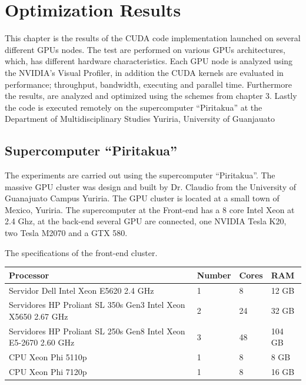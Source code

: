 
\chapter{Optimization Results} %

\label{Optimization Results} %



This chapter is the results of the CUDA code implementation launched on several different GPUs nodes. The test are performed on various GPUs architectures, which, has different hardware characteristics. Each GPU node is analyzed using the NVIDIA's Visual Profiler, in addition the CUDA kernels are evaluated in performance; throughput, bandwidth, executing and parallel time. Furthermore the results, are analyzed and optimized using the schemes from chapter 3. Lastly the code is executed remotely on the supercomputer ``Piritakua'' at the Department of Multidisciplinary Studies Yuriria, University of Guanjauato

\section{Supercomputer ``Piritakua''}

The experiments are carried out using the supercomputer “Piritakua”. The massive GPU cluster was design and built by Dr. Claudio from the University of Guanajuato Campus Yuriria. The GPU cluster is located at a small town of Mexico, Yuriria. The supercomputer at the Front-end has a 8 core Intel Xeon at 2.4 Ghz, at the back-end several GPU are connected, one NVIDIA Tesla K20, two Tesla M2070 and a GTX 580.

The specifications of the front-end cluster.

\begin{tabular}{ | p{7.1cm}  | l | l | l |}
  \hline
  Processor & Number & Cores & RAM  \\
  \hline
  Servidor Dell Intel Xeon E5620 2.4 GHz & 1 & 8 & 12 GB \\
  \hline
  Servidores HP Proliant SL 350s Gen3 Intel Xeon X5650 2.67 GHz & 2 & 24 & 32 GB \\
  \hline
   Servidores HP Proliant SL 250s Gen8 Intel Xeon E5-2670 2.60 GHz & 3 & 48 &104 GB \\
   \hline
   CPU Xeon Phi  5110p & 1 & 8 & 8 GB\\
   \hline
   CPU Xeon Phi 7120p  & 1 & 8 & 16 GB\\
   \hline
  \end{tabular}


